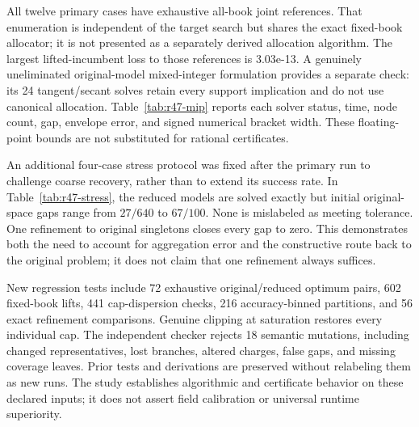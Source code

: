All twelve primary cases have exhaustive all-book joint references. That enumeration is independent of the target search but shares the exact fixed-book allocator; it is not presented as a separately derived allocation algorithm. The largest lifted-incumbent loss to those references is 3.03e-13. A genuinely uneliminated original-model mixed-integer formulation provides a separate check: its 24 tangent/secant solves retain every support implication and do not use canonical allocation. Table~\ref{tab:r47-mip} reports each solver status, time, node count, gap, envelope error, and signed numerical bracket width. These floating-point bounds are not substituted for rational certificates.

An additional four-case stress protocol was fixed after the primary run to challenge coarse recovery, rather than to extend its success rate. In Table~\ref{tab:r47-stress}, the reduced models are solved exactly but initial original-space gaps range from $27/640$ to $67/100$. None is mislabeled as meeting tolerance. One refinement to original singletons closes every gap to zero. This demonstrates both the need to account for aggregation error and the constructive route back to the original problem; it does not claim that one refinement always suffices.

New regression tests include 72 exhaustive original/reduced optimum pairs, 602 fixed-book lifts, 441 cap-dispersion checks, 216 accuracy-binned partitions, and 56 exact refinement comparisons. Genuine clipping at saturation restores every individual cap. The independent checker rejects 18 semantic mutations, including changed representatives, lost branches, altered charges, false gaps, and missing coverage leaves. Prior tests and derivations are preserved without relabeling them as new runs. The study establishes algorithmic and certificate behavior on these declared inputs; it does not assert field calibration or universal runtime superiority.
